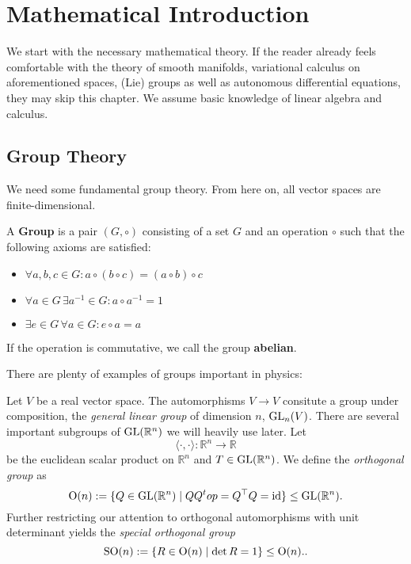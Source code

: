 \chapter{Mathematical Introduction}
\label{chap:matint}
\vspace*{-0.9cm}


We start with the necessary mathematical theory. If the reader already feels comfortable with the theory of smooth manifolds, variational calculus on aforementioned spaces, (Lie) groups as well as autonomous differential equations, they may skip this chapter. We assume basic knowledge of linear algebra and calculus.

\section{Group Theory}
We need some fundamental group theory. From here on, all vector spaces are finite-dimensional.
\begin{definition}[Group]
A \textbf{Group} is a pair $(G, \circ)$ consisting of a set $G$ and an operation $\circ$ such that the following axioms are satisfied:
\begin{itemize}
    \item $\forall a,b,c \in G: a \circ (b \circ c) = (a \circ b) \circ c$
    \item $\forall a \in G \, \exists a^{-1} \in G: a \circ a^{-1} = 1$
    \item $\exists e \in G \, \forall a \in G: e \circ a = a$
\end{itemize}
If the operation is commutative, we call the group \textbf{abelian}.
\end{definition}
There are plenty of examples of groups important in physics:
\begin{eg}
    Let $V$ be a real vector space. The automorphisms $V \to V$ consitute a group under composition, the \emph{general linear group} of dimension $n$, $\operatorname{GL}_n(V)$.
    There are several important subgroups of $\operatorname{GL}(\mathbb{R}^n)$ we will heavily use later. Let \[\langle \cdot, \cdot \rangle: \mathbb{R}^n \to \mathbb{R}\] be the euclidean scalar product on $\mathbb{R}^n$ and $T \in \operatorname{GL}(\mathbb{R}^n)$. We define the \emph{orthogonal group} as
\[\operatorname{O}(n):=\{Q \in \operatorname{GL}(\mathbb{R}^n) \mid QQ^top = Q^\top Q = \operatorname{id}\} \leq \operatorname{GL}(\mathbb{R}^n).\]  
Further restricting our attention to orthogonal automorphisms with unit determinant yields the \emph{special orthogonal group} \[
    \operatorname{SO}(n) := \{R \in \operatorname{O}(n) \mid \det R = 1\} \leq \operatorname{O}(n).
.\] 
\end{eg}
